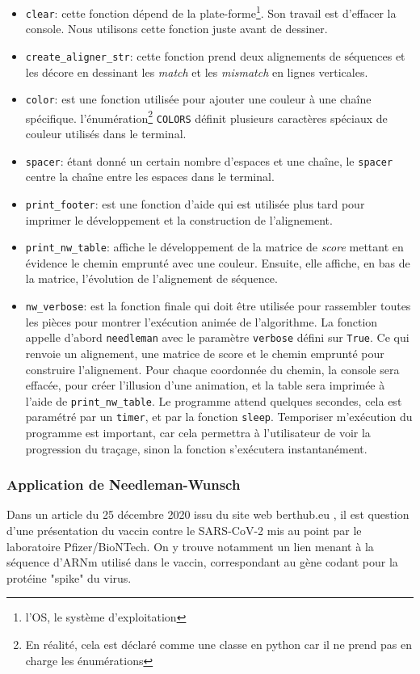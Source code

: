 \documentclass[12pt]{article}
\begin{document}
\begin{itemize}
    \item \texttt{clear}: cette fonction dépend de la plate-forme\footnote{l'OS, le système d'exploitation}. Son travail est d'effacer la console. Nous utilisons cette fonction juste avant de dessiner.
    \item \texttt{create\_aligner\_str}: cette fonction prend deux alignements de séquences et les décore en dessinant les \textsl{match} et les \textsl{mismatch} en lignes verticales.
    \item \texttt{color}: est une fonction utilisée pour ajouter une couleur à une chaîne spécifique. l'énumération\footnote{En réalité, cela est déclaré comme une classe en python car il ne prend pas en charge les énumérations} \texttt{COLORS} définit plusieurs caractères spéciaux de couleur utilisés dans le terminal.
    \item \texttt{spacer}: étant donné un certain nombre d'espaces et une chaîne, le \texttt{spacer} centre la chaîne entre les espaces dans le terminal.
    \item \texttt{print\_footer}: est une fonction d'aide qui est utilisée plus tard pour imprimer le développement et la construction de l'alignement.
    \item \texttt{print\_nw\_table}: affiche le développement de la matrice de \textsl{score} mettant en évidence le chemin emprunté avec une couleur. Ensuite, elle affiche, en bas de la matrice, l'évolution de l'alignement de séquence.
    \item \texttt{nw\_verbose}: est la fonction finale qui doit être utilisée pour rassembler toutes les pièces pour montrer l'exécution animée de l'algorithme. La fonction appelle d'abord \texttt{needleman} avec le paramètre \texttt{verbose} défini sur \texttt{True}. Ce qui renvoie un alignement, une matrice de score et le chemin emprunté pour construire l'alignement. Pour chaque coordonnée du chemin, la console sera effacée, pour créer l'illusion d'une animation, et la table sera imprimée à l'aide de \texttt{print\_nw\_table}. Le programme attend quelques secondes, cela est paramétré par un \texttt{timer}, et par la fonction \texttt{sleep}. Temporiser m'exécution du programme est important, car cela permettra à l'utilisateur de voir la progression du traçage, sinon la fonction s'exécutera instantanément.
\end{itemize}


\subsubsection{Application de Needleman-Wunsch}
Dans un article du 25 décembre 2020 issu du site web berthub.eu \cite{pfizer_vac}, il est question d'une présentation du vaccin contre le SARS-CoV-2 mis au point par le laboratoire Pfizer/BioNTech. On y trouve notamment un lien menant à la séquence d'ARNm utilisé dans le vaccin, correspondant au gène codant pour la protéine "spike" du virus.\\
\end{document}
